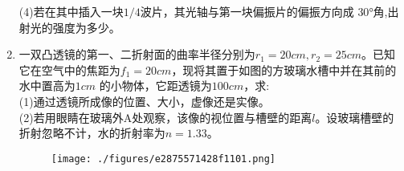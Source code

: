 \begin{enumerate}
(4)若在其中插入一块$ 1/4$波片，其光轴与第一块偏振片的偏振方向成 $30$°角,出射光的强度为多少。
\item 一双凸透镜的第一、二折射面的曲率半径分别为$r_1=20cm,r_2=25cm$。已知它在空气中的焦距为$f_1=20cm$，现将其置于如图的方玻璃水槽中并在其前的水中置高为$1cm$ 的小物体，它距透镜为$100cm$，求:\\
(1)通过透镜所成像的位置、大小，虚像还是实像。\\
(2)若用眼睛在玻璃外A处观察，该像的视位置与槽壁的距离$l$。设玻璃槽壁的折射忽略不计，水的折射率为$n=1.33$。
\begin{figure}[ht]
\centering
\texttt{[image: ./figures/e2875571428f1101.png]}
\caption{} \label{fig_HGD02_1}
\end{figure}
\end{enumerate}